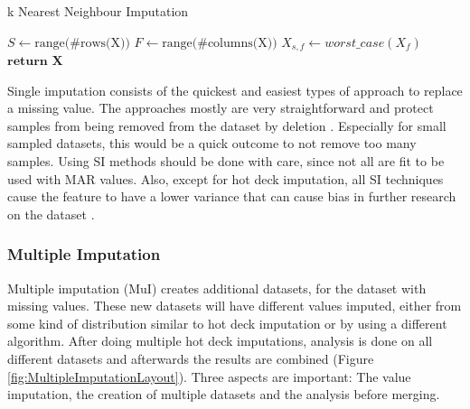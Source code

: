 \documentclass[10pt,a4paper]{report}
\begin{document}
\begin{itemize}
		\begin{algorithm}[H]
			\caption{k Nearest Neighbour Imputation}\label{alg:WorstCaseImputation}
			\begin{algorithmic}[1]
				\State $S \gets \text{range(\#rows(X))}$ 	
				\State $F \gets \text{range(\#columns(X))}$ 	
				 					
				 				 			
				\State $X_{s,f} \gets \textit{worst\_case}(X_f)$	
				\EndIf
				\EndFor
				\State $\textbf{return X}$
				\EndProcedure
			\end{algorithmic}
		\end{algorithm}
		
	\end{itemize}
	
	Single imputation consists of the quickest and easiest types of approach to replace a missing value. The approaches mostly are very straightforward and protect samples from being removed from the dataset by deletion \cite{haukoos2007advanced, cartwright2003dealing}. Especially for small sampled datasets, this would be a quick outcome to not remove too many samples. Using SI methods should be done with care, since not all are fit to be used with MAR values. Also, except for hot deck imputation, all SI techniques cause the feature to have a lower variance that can cause bias in further research on the dataset \cite{donders2006gentle}. 
	
	\subsubsection{Multiple Imputation}
	\label{DEsubsec:MultipleImputation}
	
	Multiple imputation (MuI) creates additional datasets, for the dataset with missing values. These new datasets will have different values imputed, either from some kind of distribution similar to hot deck imputation or by using a different algorithm. After doing multiple hot deck imputations, analysis is done on all different datasets and afterwards the results are combined (Figure \ref{fig:MultipleImputationLayout}). Three aspects are important: The value imputation, the creation of multiple datasets and the analysis before merging.
	
\end{document}
